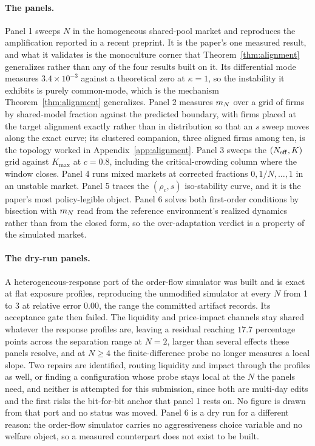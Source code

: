 \paragraph{The panels.} Panel 1 sweeps $N$ in the homogeneous shared-pool market and reproduces the amplification reported in a recent preprint. It is the paper's one measured result, and what it validates is the monoculture corner that Theorem~\ref{thm:alignment} generalizes rather than any of the four results built on it. Its differential mode measures $3.4\times 10^{-3}$ against a theoretical zero at $\kappa=1$, so the instability it exhibits is purely common-mode, which is the mechanism Theorem~\ref{thm:alignment} generalizes. Panel 2 measures $m_N$ over a grid of firms by shared-model fraction against the predicted boundary, with firms placed at the target alignment exactly rather than in distribution so that an $s$ sweep moves along the exact curve; its clustered companion, three aligned firms among ten, is the topology worked in Appendix~\ref{app:alignment}. Panel 3 sweeps the $(N_{\mathrm{eff}}, K)$ grid against $K_{\max}$ at $c = 0.8$, including the critical-crowding column where the window closes. Panel 4 runs mixed markets at corrected fractions $0, 1/N, \ldots, 1$ in an unstable market. Panel 5 traces the $(\rho_c, s)$ iso-stability curve, and it is the paper's most policy-legible object. Panel 6 solves both first-order conditions by bisection with $m_N$ read from the reference environment's realized dynamics rather than from the closed form, so the over-adaptation verdict is a property of the simulated market.

\paragraph{The dry-run panels.} A heterogeneous-response port of the order-flow simulator was built and is exact at flat exposure profiles, reproducing the unmodified simulator at every $N$ from 1 to 3 at relative error $0.00$, the range the committed artifact records. Its acceptance gate then failed. The liquidity and price-impact channels stay shared whatever the response profiles are, leaving a residual reaching $17.7$ percentage points across the separation range at $N=2$, larger than several effects these panels resolve, and at $N \geq 4$ the finite-difference probe no longer measures a local slope. Two repairs are identified, routing liquidity and impact through the profiles as well, or finding a configuration whose probe stays local at the $N$ the panels need, and neither is attempted for this submission, since both are multi-day edits and the first risks the bit-for-bit anchor that panel 1 rests on. No figure is drawn from that port and no status was moved. Panel 6 is a dry run for a different reason: the order-flow simulator carries no aggressiveness choice variable and no welfare object, so a measured counterpart does not exist to be built.

